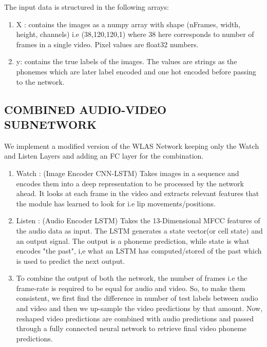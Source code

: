 \documentclass{article}
\begin{document}
The input data is structured in the following arrays:
\begin{enumerate}
    \item X : contains the images as a numpy array with shape (nFrames, width, height, channels) i.e (38,120,120,1) where 38 here corresponds to number of frames in a single video. Pixel values are float32 numbers.
    \item y: contains the true labels of the images. The values are strings as the phonemes which are later label encoded and one hot encoded before passing to the network. 
\end{enumerate}

\subsection{COMBINED AUDIO-VIDEO SUBNETWORK}
We implement a modified version of the WLAS Network keeping only the Watch and Listen Layers and adding an FC layer for the combination. \cite{LipreadingInWild}
\begin{enumerate}
    \item Watch : (Image Encoder CNN-LSTM) Takes images in a sequence and encodes them into a deep representation to be processed by the network ahead. It looks at each frame in the video and extracts relevant features that the module has learned to look for i.e lip movements/positions.
    \item Listen : (Audio Encoder LSTM) Takes the 13-Dimensional MFCC features of the audio data as input. The LSTM generates a state vector(or cell state) and an output signal. The output is a phoneme prediction, while state is what encodes "the past", i,e what an LSTM has computed/stored of the past which is used to predict the next output.
    \item To combine the output of both the network, the number of frames i.e the frame-rate is required to be equal for audio and video. So, to make them consistent, we first find the difference in number of test labels between audio and video and then we up-sample the video predictions by that amount. Now, reshaped video predictions are combined with audio predictions and passed through a fully connected neural network to retrieve final video phoneme predictions.
\end{enumerate}
  
\end{document}
